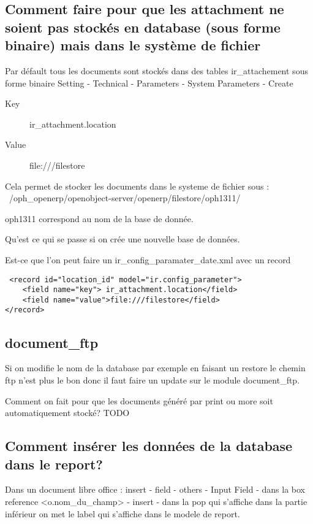 \documentclass[12pt,a4paper]{article}
\begin{document}
\subsection{Comment faire pour que les attachment ne soient pas stockés en database (sous forme binaire) mais dans le système de fichier}
\label{sec:attachment}

Par défault tous les documents sont stockés dans des tables ir\_attachement sous forme binaire 
Setting - Technical - Parameters - System Parameters - Create 
\begin{description}
\item[Key] ir\_attachment.location
\item[Value] file:///filestore
\end{description}

Cela permet de stocker les documents dans le systeme de fichier sous :
 ~/oph\_openerp/openobject-server/openerp/filestore/oph1311/

oph1311 correspond au nom de la base de donnée. 

Qu'est ce qui se passe si on crée une nouvelle base de données.


Est-ce que l'on peut faire un ir\_config\_paramater\_date.xml avec un record

\begin{verbatim}
 <record id="location_id" model="ir.config_parameter">
    <field name="key"> ir_attachment.location</field>
    <field name="value">file:///filestore</field>
</record>
\end{verbatim}

\subsection{document\_ftp}
\label{sec:document_ftp}

Si on modifie le nom de la database par exemple en faisant un restore le chemin ftp n'est plus le bon donc il faut faire un update sur le module document\_ftp.

Comment on fait pour que les documents généré par print ou more soit automatiquement stocké? TODO
\subsection{Comment insérer les données de la database dans le report?}
\label{sec:field}

Dans un document libre office : 
insert - field - others - Input Field - dans la box reference <o.nom\_du\_champ> - insert - dans la pop qui s'affiche dans la partie inférieur 
on met le label qui s'affiche dans le modele de report. 
\end{document}
